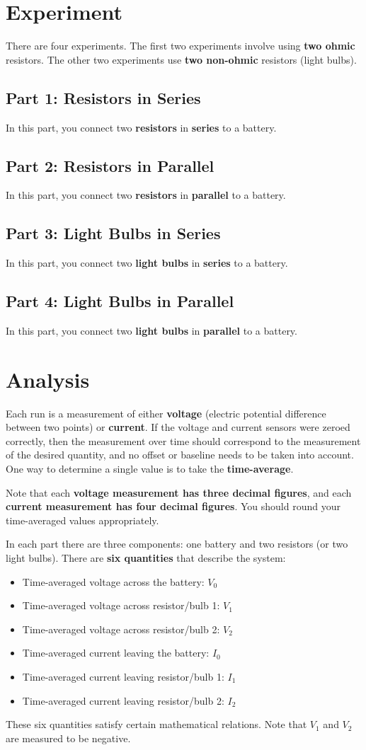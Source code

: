 \section{Experiment}
%
There are four experiments. The first two experiments involve using \textbf{two ohmic} resistors. The other two experiments use \textbf{two non-ohmic} resistors (light bulbs).
%
\subsection{Part 1: Resistors in Series}
%
In this part, you connect two \textbf{resistors} in \textbf{series} to a battery.
%
\subsection{Part 2: Resistors in Parallel}
%
In this part, you connect two \textbf{resistors} in \textbf{parallel} to a battery.
%
\subsection{Part 3: Light Bulbs in Series}
%
In this part, you connect two \textbf{light bulbs} in \textbf{series} to a battery.
%
\subsection{Part 4: Light Bulbs in Parallel}
%
In this part, you connect two \textbf{light bulbs} in \textbf{parallel} to a battery.
%
\section{Analysis}
%
Each run is a measurement of either \textbf{voltage} (electric potential difference between two points) or \textbf{current}. If the voltage and current sensors were zeroed correctly, then the measurement over time should correspond to the measurement of the desired quantity, and no offset or baseline needs to be taken into account. One way to determine a single value is to take the \textbf{time-average}.

Note that each \textbf{voltage measurement has three decimal figures}, and each \textbf{current measurement has four decimal figures}. You should round your time-averaged values appropriately.

In each part there are three components: one battery and two resistors (or two light bulbs). There are \textbf{six quantities} that describe the system:
\begin{itemize}
	\item Time-averaged voltage across the battery: $V_{0}$
	\item Time-averaged voltage across resistor/bulb 1: $V_{1}$
	\item Time-averaged voltage across resistor/bulb 2: $V_{2}$
	\item Time-averaged current leaving the battery: $I_{0}$
	\item Time-averaged current leaving resistor/bulb 1: $I_{1}$
	\item Time-averaged current leaving resistor/bulb 2: $I_{2}$
\end{itemize}
These six quantities satisfy certain mathematical relations. Note that $V_{1}$ and $V_{2}$ are measured to be negative.
%
